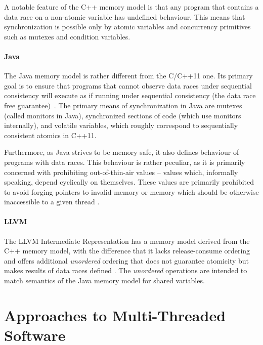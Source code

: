 A notable feature of the C++ memory model is that any program that contains a
data race on a non-atomic variable has undefined
behaviour.
This means that synchronization is possible only by atomic variables and
concurrency primitives such as mutexes and condition variables.

\paragraph{Java}
%
The Java memory model is rather different from the C/C++11 one.
Its primary goal is to ensure that programs that cannot observe data races
under sequential consistency will execute as if running under sequential
consistency (the data race free guarantee)~.
The primary means of synchronization in Java are mutexes (called monitors in Java), synchronized sections of code (which use monitors internally), and volatile variables, which roughly correspond to sequentially consistent atomics in C++11.

Furthermore, as Java strives to be memory safe, it also defines behaviour of programs with data races.
This behaviour is rather peculiar, as it is primarily concerned with prohibiting out-of-thin-air values -- values which, informally speaking, depend cyclically on themselves.
These values are primarily prohibited to avoid forging pointers to invalid memory or memory which should be otherwise inaccessible to a given thread .

\paragraph{LLVM}
%
The LLVM Intermediate Representation has a memory model derived from the C++
memory model, with the difference that it lacks release-consume ordering and
offers additional \emph{unordered} ordering that does not guarantee atomicity
but makes results of data races defined .
The \emph{unordered} operations are intended to match semantics of the Java
memory model for shared variables.

\section{Approaches to Multi-Threaded Software}

